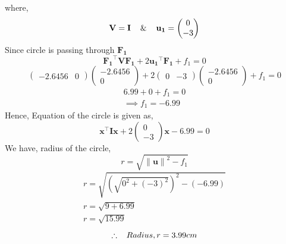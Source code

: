 \documentclass[journal,10pt,twocolumn]{article}
\providecommand{\norm}[1]{\left\lVert#1\right\rVert}
\let\vec\mathbf
\newcommand{\myvec}[1]{\ensuremath{\begin{pmatrix}#1\end{pmatrix}}}
\providecommand{\brak}[1]{\ensuremath{\left(#1\right)}}
\begin{document}
where, 
\begin{equation}
\vec{V} = \vec{I} \hspace{4mm} \& \hspace{4mm} \vec{u_1} = \myvec{0 \\ -3}
\end{equation}
Since circle is passing through $\vec{F_1}$
\begin{equation}
\vec{F_1}^{\top}\vec{V}\vec{F_1}+2\vec{u_1}^{\top}\vec{F_1}+f_1=0 
\label{eq-18-}
\end{equation} \vspace{1mm}
\begin{equation}
\myvec{-2.6456 & 0} \myvec{-2.6456 \\ 0} +  2\myvec{0 & -3}\myvec{-2.6456 \\ 0} +  f_1 = 0 
\end{equation}
\begin{gather*}
6.99 + 0 +  f_1 = 0 \\
\implies f_1 = -6.99
\end{gather*}
Hence, Equation of the circle is given as,
\begin{equation}
\vec{x}^{\top}\vec{I}\vec{x}+2\myvec{0 \\ -3}\vec{x}-6.99=0
\label{eq-20-}
\end{equation}
We have, radius of the circle,
\begin{equation}
r = \sqrt{\norm{\vec{u}}^2-f_1}
\label{eq-21-}
\end{equation}
\begin{gather*}
r = \sqrt{\brak{\sqrt{0^2 + (-3)^2}}^2-(-6.99)} \\
r = \sqrt{9+6.99} \\
r = \sqrt{15.99}
\end{gather*}
\begin{equation}
\therefore \hspace{3mm} Radius, r = 3.99 cm
\label{eq-22-}
\end{equation}
\end{document}
